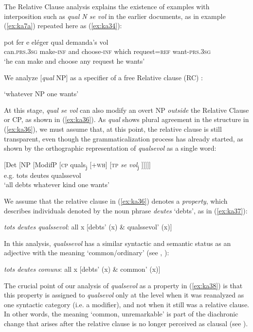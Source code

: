 \documentclass[output=paper,colorlinks,citecolor=brown]{langscibook}
\begin{document}
The Relative Clause analysis explains the existence of examples with interposition such as \textit{qual N se vol} in the earlier documents, as in example (\ref{ex:ka7a}) repeated here as (\ref{ex:ka34}):

\ea\label{ex:ka34}
    \gll pot fer e eléger qual demanda’s vol\\
    can.\textsc{prs.3sg} make-\textsc{inf} and choose-\textsc{inf} which request=\textsc{ref} want-\textsc{prs.3sg}\\
    \glt ‘he can make and choose any request he wants’
\z

We analyze [\textit{qual} NP] as a specifier of a free Relative clause (RC) \citep{Kellert2021c}:

 
\glt     ‘whatever NP one wants’ 
\z

At this stage, \textit{qual se vol} can also modify an overt NP \textit{outside} the Relative Clause or CP, as shown in (\ref{ex:ka36}). As \textit{qual} shows plural agreement in the structure in (\ref{ex:ka36}), we must assume that, at this point, the relative clause is still transparent, even though the grammaticalization process has already started, as shown by the orthographic representation of \textit{qualsevol} as a single word:

\ea \label{ex:ka36}
    [Det 	[NP [ModifP [\textsc{cp} quals\textsubscript{j} [\textsc{+wh}] [\textsc{tp} \textit{se vol}\textsubscript{j} ]]]]]\\
    e.g. tots deutes qualssevol\\
    ‘all debts whatever kind one wants’
\z
    
We assume that the relative clause in (\ref{ex:ka36}) denotes a \textit{property}, which describes individuals denoted by the noun phrase \textit{deutes} ‘debts’, as in (\ref{ex:ka37}):
 
\ea \label{ex:ka37}
    \textit{tots deutes qualssevol}: all x [debts’ (x) \& qualssevol’ (x)]
\z

In this analysis, \textit{qualssevol} has a similar syntactic and semantic status as an adjective with the meaning ‘common/ordinary’ (see , \cite{Kellert2021c}):

\ea \label{ex:ka38}
    \textit{tots deutes comuns}: all x [debts’ (x) \& common’ (x)]\\
\z

The crucial point of our analysis of \textit{qualsevol} as a property in (\ref{ex:ka38}) is that this property is assigned to \textit{qualsevol} only at the level when it was reanalyzed as one syntactic category (i.e. a modifier), and not when it still was a relative clause. In other words, the meaning ‘common, unremarkable’ is part of the diachronic change that arises after the relative clause is no longer perceived as clausal (see ).
\end{document}
